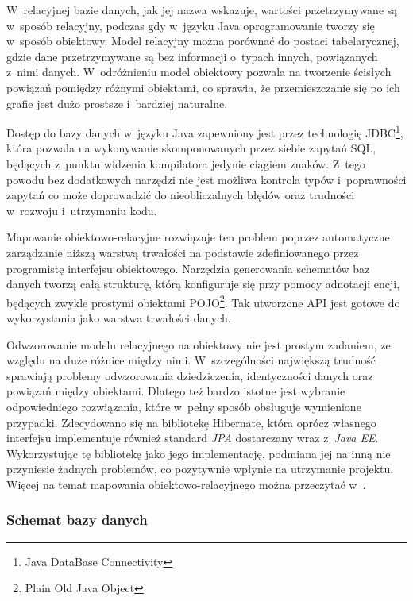 \documentclass[11pt]{aghdpl}
\begin{document}
W~relacyjnej bazie danych, jak jej nazwa wskazuje, wartości przetrzymywane są w~sposób relacyjny, podczas gdy w~języku Java oprogramowanie tworzy się w~sposób obiektowy. Model relacyjny można porównać do postaci tabelarycznej, gdzie dane przetrzymywane są bez informacji o~typach innych, powiązanych z~nimi danych. W~odróżnieniu model obiektowy pozwala na tworzenie ścisłych powiązań pomiędzy różnymi obiektami, co sprawia, że przemieszczanie się po ich grafie jest dużo prostsze i~bardziej naturalne.

Dostęp do bazy danych w~języku Java zapewniony jest przez technologię JDBC\footnote{Java DataBase Connectivity}, która pozwala na wykonywanie skomponowanych przez siebie zapytań SQL, będących z~punktu widzenia kompilatora jedynie ciągiem znaków. Z~tego powodu bez dodatkowych narzędzi nie jest możliwa kontrola typów i~poprawności zapytań co może doprowadzić do nieobliczalnych błędów oraz trudności w~rozwoju i~utrzymaniu kodu.

Mapowanie obiektowo-relacyjne rozwiązuje ten problem poprzez automatyczne zarządzanie niższą warstwą trwałości na podstawie zdefiniowanego przez programistę interfejsu obiektowego. Narzędzia generowania schematów baz danych tworzą całą strukturę, którą konfiguruje się przy pomocy adnotacji encji, będących zwykle prostymi obiektami POJO\footnote{Plain Old Java Object}. Tak utworzone API jest gotowe do wykorzystania jako warstwa trwałości danych.

Odwzorowanie modelu relacyjnego na obiektowy nie jest prostym zadaniem, ze względu na duże różnice między nimi. W~szczególności największą trudność sprawiają problemy odwzorowania dziedziczenia, identyczności danych oraz powiązań między obiektami. Dlatego też bardzo istotne jest wybranie odpowiedniego rozwiązania, które w~pełny sposób obsługuje wymienione przypadki. Zdecydowano się na bibliotekę Hibernate, która oprócz własnego interfejsu implementuje również standard \emph{JPA} dostarczany wraz z~\emph{Java EE}. Wykorzystując tę bibliotekę jako jego implementację, podmiana jej na inną nie przyniesie żadnych problemów, co pozytywnie wpłynie na utrzymanie projektu. Więcej na temat mapowania obiektowo-relacyjnego można przeczytać w~\cite{HORM}.

\subsubsection{Schemat bazy danych}
\end{document}
